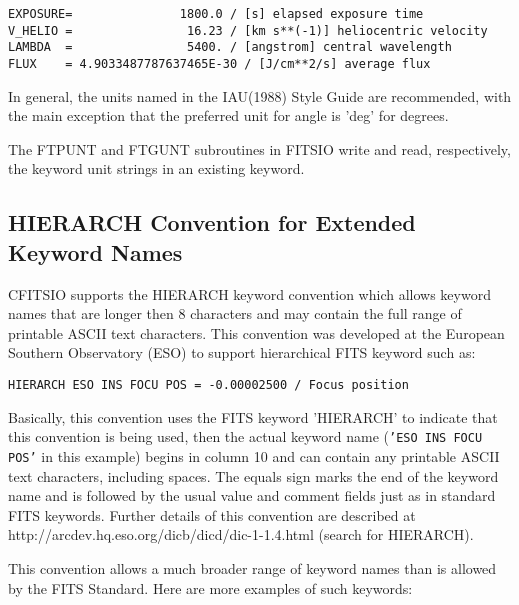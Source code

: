 \documentclass[11pt]{book}
\begin{document}
\begin{verbatim}
EXPOSURE=               1800.0 / [s] elapsed exposure time
V_HELIO =                16.23 / [km s**(-1)] heliocentric velocity
LAMBDA  =                5400. / [angstrom] central wavelength
FLUX    = 4.9033487787637465E-30 / [J/cm**2/s] average flux
\end{verbatim}

In general, the units named in the IAU(1988) Style Guide are
recommended, with the main exception that the preferred unit for angle
is 'deg' for degrees.

The FTPUNT and FTGUNT subroutines in FITSIO write and read,
respectively, the keyword unit strings in an existing keyword.


\subsection{HIERARCH Convention for Extended Keyword Names}

CFITSIO supports the HIERARCH keyword convention which allows keyword
names that are longer then 8 characters and may contain the full range
of printable ASCII text characters.  This convention
was developed at the European Southern Observatory (ESO)  to support
hierarchical FITS keyword such as:

\begin{verbatim}
HIERARCH ESO INS FOCU POS = -0.00002500 / Focus position
\end{verbatim}
Basically, this convention uses the FITS keyword 'HIERARCH' to indicate
that this convention is being used, then the actual keyword name
({\tt'ESO INS FOCU POS'} in this example) begins in column 10 and can
contain any printable ASCII text characters, including spaces.  The
equals sign marks the end of the keyword name and is followed by the
usual value and comment fields just as in standard FITS keywords.
Further details of this convention are described at
http://arcdev.hq.eso.org/dicb/dicd/dic-1-1.4.html (search for
HIERARCH).

This convention allows a much broader range of keyword names
than is allowed by the FITS Standard.  Here are more examples
of such keywords:
\end{document}
